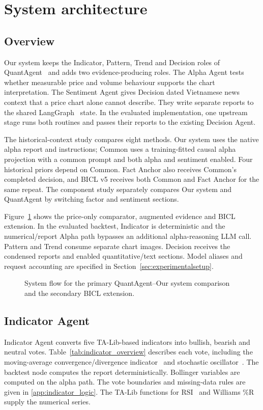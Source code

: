\section{System architecture}
\label{sec:systemarchitecture}
\subsection{Overview}

Our system keeps the Indicator, Pattern, Trend and Decision roles of QuantAgent~\cite{xiong2025quantagent} and adds two evidence-producing roles. The Alpha Agent tests whether measurable price and volume behaviour supports the chart interpretation. The Sentiment Agent gives Decision dated Vietnamese news context that a price chart alone cannot describe. They write separate reports to the shared LangGraph~\cite{langgraph_docs} state. In the evaluated implementation, one upstream stage runs both routines and passes their reports to the existing Decision Agent.

The historical-context study compares eight methods. Our system uses the native alpha report and instructions; Common uses a training-fitted causal alpha projection with a common prompt and both alpha and sentiment enabled. Four historical priors depend on Common. Fact Anchor also receives Common's completed decision, and BICL v5 receives both Common and Fact Anchor for the same repeat. The component study separately compares Our system and QuantAgent by switching factor and sentiment sections.

Figure~\ref{fig:flow} shows the price-only comparator, augmented evidence and BICL extension. In the evaluated backtest, Indicator is deterministic and the numerical/report Alpha path bypasses an additional alpha-reasoning LLM call. Pattern and Trend consume separate chart images. Decision receives the condensed reports and enabled quantitative/text sections. Model aliases and request accounting are specified in Section~\ref{sec:experimentalsetup}.

\begin{figure}[!htb]
\centering

\caption{System flow for the primary QuantAgent--Our system comparison and the secondary BICL extension.}
\label{fig:flow}
\end{figure}

\subsection{Indicator Agent}
Indicator Agent converts five TA-Lib-based indicators into bullish,
bearish and neutral votes. Table~\ref{tab:indicator_overview} describes
each vote, including the moving-average convergence/divergence
indicator~\cite{appel2005technical} and stochastic oscillator~\cite{murphy1999technical}.
The backtest node computes the report deterministically.
Bollinger variables are computed on the alpha path. The vote boundaries
and missing-data rules are given in \ref{app:indicator_logic}. The TA-Lib
functions for RSI~\cite{talib_rsi_docs} and Williams \%R~\cite{talib_willr_docs}
supply the numerical series.

